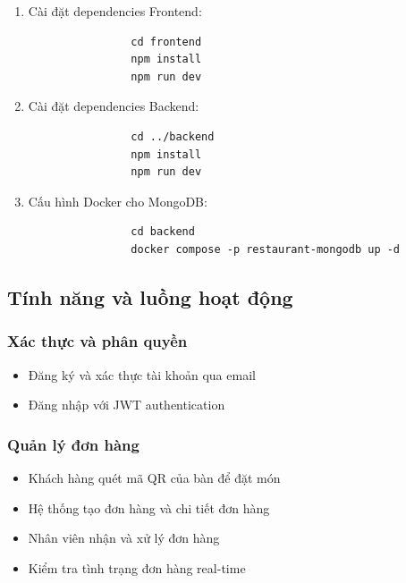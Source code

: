 \documentclass[a4paper]{article}
\begin{document}
\begin{itemize}
\begin{enumerate}
            \item Cài đặt dependencies Frontend:
            \begin{verbatim}
                cd frontend
                npm install
                npm run dev
            \end{verbatim}
            
            \item Cài đặt dependencies Backend:
            \begin{verbatim}
                cd ../backend
                npm install
                npm run dev
            \end{verbatim}
            
            \item Cấu hình Docker cho MongoDB:
            \begin{verbatim}
                cd backend
                docker compose -p restaurant-mongodb up -d
            \end{verbatim}
        \end{enumerate}

    \subsection{Tính năng và luồng hoạt động}
        \subsubsection{Xác thực và phân quyền}
        \begin{itemize}
            \item Đăng ký và xác thực tài khoản qua email
            \item Đăng nhập với JWT authentication
        \end{itemize}
        
        \subsubsection{Quản lý đơn hàng}
        \begin{itemize}
            \item Khách hàng quét mã QR của bàn để đặt món
            \item Hệ thống tạo đơn hàng và chi tiết đơn hàng
            \item Nhân viên nhận và xử lý đơn hàng
            \item Kiểm tra tình trạng đơn hàng real-time
        \end{itemize}
        

\end{itemize}
\end{document}
